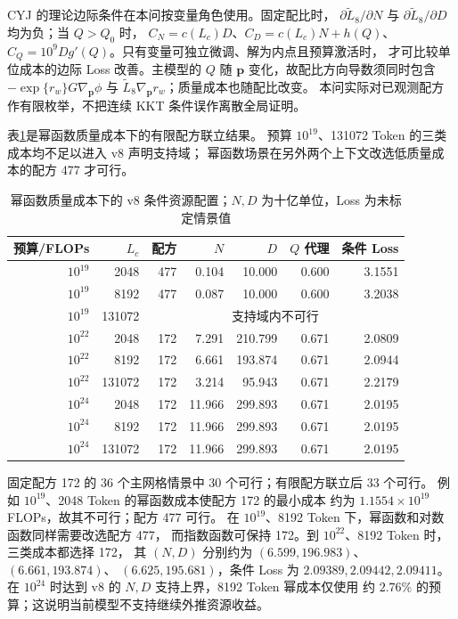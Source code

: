 CYJ 的理论边际条件在本问按变量角色使用。固定配比时，
$\partial\widetilde L_8/\partial N$ 与
$\partial\widetilde L_8/\partial D$ 均为负；当 $Q>Q_0$ 时，
$C_N=c(L_c)D$、$C_D=c(L_c)N+h(Q)$、
$C_Q=10^9Dg'(Q)$。只有变量可独立微调、解为内点且预算激活时，
才可比较单位成本的边际 Loss 改善。主模型的 $Q$ 随 $\boldsymbol p$
变化，故配比方向导数须同时包含
$-\exp\{r_w\}G\nabla_{\boldsymbol p}\phi$ 与
$\widetilde L_8\nabla_{\boldsymbol p}r_w$；质量成本也随配比改变。
本问实际对已观测配方作有限枚举，不把连续 KKT 条件误作离散全局证明。

表\ref{tab:q3_v8_power}是幂函数质量成本下的有限配方联立结果。
预算 $10^{19}$、131072 Token 的三类成本均不足以进入 v8 声明支持域；
幂函数场景在另外两个上下文改选低质量成本的配方 477 才可行。
\begin{table}[htbp]
\centering\small
\caption{幂函数质量成本下的 v8 条件资源配置；$N,D$ 为十亿单位，Loss 为未标定情景值}
\label{tab:q3_v8_power}
\begin{tabular}{rrrrrrr}
\toprule
预算/FLOPs & $L_c$ & 配方 & $N$ & $D$ & $Q$ 代理 & 条件 Loss\\
\midrule
$10^{19}$ & 2048 & 477 & 0.104 & 10.000 & 0.600 & 3.1551\\
$10^{19}$ & 8192 & 477 & 0.087 & 10.000 & 0.600 & 3.2038\\
$10^{19}$ & 131072 & \multicolumn{5}{c}{支持域内不可行}\\
$10^{22}$ & 2048 & 172 & 7.291 & 210.799 & 0.671 & 2.0809\\
$10^{22}$ & 8192 & 172 & 6.661 & 193.874 & 0.671 & 2.0944\\
$10^{22}$ & 131072 & 172 & 3.214 & 95.943 & 0.671 & 2.2179\\
$10^{24}$ & 2048 & 172 & 11.966 & 299.893 & 0.671 & 2.0195\\
$10^{24}$ & 8192 & 172 & 11.966 & 299.893 & 0.671 & 2.0195\\
$10^{24}$ & 131072 & 172 & 11.966 & 299.893 & 0.671 & 2.0195\\
\bottomrule
\end{tabular}
\end{table}

固定配方 172 的 36 个主网格情景中 30 个可行；有限配方联立后 33 个可行。
例如 $10^{19}$、2048 Token 的幂函数成本使配方 172 的最小成本
约为 $1.1554\times10^{19}$ FLOPs，故其不可行；配方 477 可行。
在 $10^{19}$、8192 Token 下，幂函数和对数函数同样需要改选配方 477，
而指数函数可保持 172。到 $10^{22}$、8192 Token 时，三类成本都选择 172，
其 $(N,D)$ 分别约为 $(6.599,196.983)$、$(6.661,193.874)$、
$(6.625,195.681)$，条件 Loss 为 $2.09389,2.09442,2.09411$。
在 $10^{24}$ 时达到 v8 的 $N,D$ 支持上界，8192 Token 幂成本仅使用
约 $2.76\%$ 的预算；这说明当前模型不支持继续外推资源收益。

